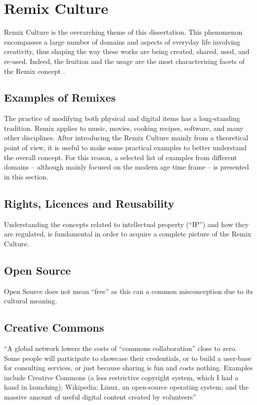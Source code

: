 \chapter{Remix Culture}
\label{ch:ch1_RemixCulture}


Remix Culture is the overarching theme of this dissertation. This phenomenon encompasses a large number of domains and aspects of everyday life involving creativity, thus shaping the way these works are being created, shared, used, and re-used. Indeed, the fruition and the usage are the most characterising facets of the Remix concept .

\section{Examples of Remixes}

The practice of modifying both physical and digital items has a long-standing tradition. Remix applies to music, movies, cooking recipes, software, and many other disciplines. After introducing the Remix Culture mainly from a theoretical point of view, it is useful to make some practical examples to better understand the overall concept. For this reason, a selected list of examples from different domains – although mainly focused on the modern age time frame – is presented in this section.

\section{Rights, Licences and Reusability}

Understanding the concepts related to intellectual property (“IP”) and how they are regulated, is fundamental in order to acquire a complete picture of the Remix Culture.

\section{Open Source}

Open Source does not mean “free” as this can a common misconception due to its cultural meaning.

\section{Creative Commons}

“A global network lowers the costs of “commons collaboration” close to zero. Some people will participate to showcase their credentials, or to build a user-base for consulting services, or just because sharing is fun and costs nothing. Examples include Creative Commons (a less restrictive copyright system, which I had a hand in launching); Wikipedia; Linux, an open-source operating system; and the massive amount of useful digital content created by volunteers” 